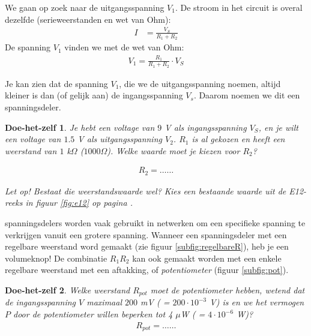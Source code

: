 \documentclass{article}
\newtheorem{DIY}{Doe-het-zelf}
\begin{document}
			We gaan op zoek naar de uitgangsspanning $V_1$. De stroom in het circuit is overal dezelfde (serieweerstanden en wet van Ohm):
			\begin{align}
			    I &= \frac{V_S}{R_1 + R_2}
			\end{align}
			De spanning $V_1$ vinden we met de wet van Ohm:
			\begin{align}
			    V_1 = \frac{R_1}{R_1+R_2} \cdot V_S
			\end{align}

			Je kan zien dat de spanning $V_1$, die we de uitgangsspanning noemen, altijd kleiner is dan (of gelijk aan) de ingangsspanning $V_s$. Daarom noemen we dit een spanningsdeler.

			\begin{DIY}
				Je hebt een voltage van $9$ V als ingangsspanning $V_S$, en je wilt een voltage van $1.5$ V als uitgangsspanning $V_2$. $R_1$ is al gekozen en heeft een weerstand van $1$ k$\Omega$ ($1000 \Omega$). Welke waarde moet je kiezen voor $R_2$?
				
				\begin{align*}
				    R_2 = \ldots\ldots
				\end{align*}

				Let op! Bestaat die weerstandswaarde wel? Kies een bestaande waarde uit de E12-reeks in figuur \ref{fig:e12} op pagina \pageref{fig:e12}.
			\end{DIY}

			spanningsdelers worden vaak gebruikt in netwerken om een specifieke spanning te verkrijgen vanuit een grotere spanning.
			Wanneer een spanningsdeler met een regelbare weerstand word gemaakt (zie figuur \ref{subfig:regelbareR}), heb je een volumeknop! De combinatie $R_1R_2$ kan ook gemaakt worden met een enkele regelbare weerstand met een aftakking, of \emph{potentiometer} (figuur \ref{subfig:pot}).

			\begin{DIY} Welke weerstand $R_{pot}$ moet de potentiometer hebben, wetend dat de ingangsspanning $V$ maximaal $200$ mV ( = $200 \cdot 10^{-3}$ V) is en we het vermogen $P$ door de potentiometer willen beperken tot 4 $\mu$W ( = $4 \cdot 10^{-6}$ W)? 
			\begin{align*}
			    R_{pot} = \ldots\ldots
			\end{align*}
			\end{DIY}			
\end{document}
